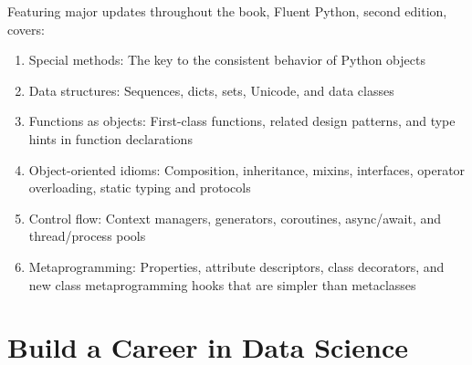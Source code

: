 		
		
		
		\noindent Featuring major updates throughout the book, Fluent Python, second edition, covers:
		\begin{enumerate}
			\item Special methods: The key to the consistent behavior of Python objects
			\item Data structures: Sequences, dicts, sets, Unicode, and data classes
			\item Functions as objects: First-class functions, related design patterns, and type hints in function declarations
			\item Object-oriented idioms: Composition, inheritance, mixins, interfaces, operator overloading, static typing and protocols
			\item Control flow: Context managers, generators, coroutines, async/await, and thread/process pools
			\item Metaprogramming: Properties, attribute descriptors, class decorators, and new class metaprogramming hooks that are simpler than metaclasses
		\end{enumerate}
		
		\clearpage
		\section{Build a Career in Data Science}
		\label{sec:build-career}
		
		\begin{inparadesc}
			\item \laterread
			\item \nearfivehpages
			\item {}
		\end{inparadesc}
		\vspace{3mm}
		
